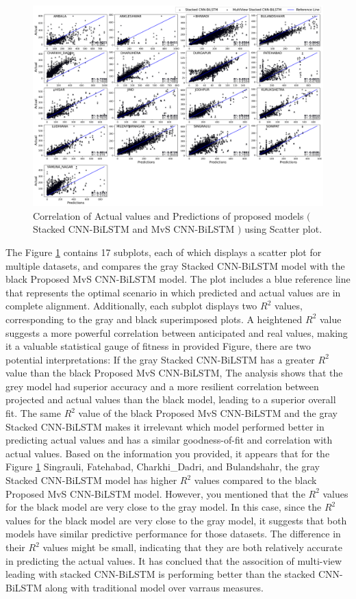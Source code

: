 \documentclass[a4paper,fleqn]{cas-sc}
\begin{document}
\begin{figure}[ht]
	\centering
		\includegraphics[scale=0.35]{img/Scatter_plot}
	  \caption{Correlation of Actual values and Predictions of proposed models $($Stacked CNN-BiLSTM and MvS CNN-BiLSTM $)$ using Scatter plot.}\label{Scatter}
\end{figure}
The Figure \ref{Scatter} contains 17 subplots, each of which displays a scatter plot for multiple datasets, and compares the gray Stacked CNN-BiLSTM model with the black Proposed MvS CNN-BiLSTM model. The plot includes a blue reference line that represents the optimal scenario in which predicted and actual values are in complete alignment. Additionally, each subplot displays two $R^2$ values, corresponding to the gray and black superimposed plots. A heightened $R^2$ value suggests a more powerful correlation between anticipated and real values, making it a valuable statistical gauge of fitness in provided Figure, there are two potential interpretations: If the gray Stacked CNN-BiLSTM has a greater $R^2$ value than the black Proposed MvS CNN-BiLSTM, The analysis shows that the grey model had superior accuracy and a more resilient correlation between projected and actual values than the black model, leading to a superior overall fit. The same $R^2$ value of the black Proposed MvS CNN-BiLSTM and the gray Stacked CNN-BiLSTM makes it irrelevant which model performed better in predicting actual values and has a similar goodness-of-fit and correlation with actual values. Based on the information you provided, it appears that for the Figure \ref{Scatter} Singrauli, Fatehabad, Charkhi\_Dadri, and Bulandshahr, the gray Stacked CNN-BiLSTM model has higher $R^2$ values compared to the black Proposed MvS CNN-BiLSTM model. However, you mentioned that the $R^2$ values for the black model are very close to the gray model. In this case, since the $R^2$ values for the black model are very close to the gray model, it suggests that both models have similar predictive performance for those datasets. The difference in their $R^2$ values might be small, indicating that they are both relatively accurate in predicting the actual values. It has conclued that the assocition of multi-view leading with stacked CNN-BiLSTM is performing better than the stacked CNN-BiLSTM along with traditional model over varraus measures.
\end{document}
